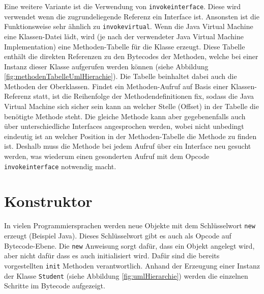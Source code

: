 \documentclass[conference]{IEEEtran}
\begin{document}
Eine weitere Variante ist die Verwendung von \verb|invokeinterface|. Diese wird verwendet wenn die zugrundeliegende Referenz ein Interface ist. Ansonsten ist die Funktionsweise sehr ähnlich zu \verb|invokevirtual|. Wenn die Java Virtual Machine eine Klassen-Datei lädt, wird (je nach der verwendeter Java Virtual Machine Implementation) eine Methoden-Tabelle für die Klasse erzeugt. Diese Tabelle enthält die direkten Referenzen zu den Bytecodes der Methoden, welche bei einer Instanz dieser Klasse aufgerufen werden können (siehe Abbildung \ref{fig:methodenTabelleUmlHierachie}). Die Tabelle beinhaltet dabei auch die Methoden der Oberklassen. Findet ein Methoden-Aufruf auf Basis einer Klassen-Referenz statt, ist die Reihenfolge der Methodendefinitionen fix, sodass die Java Virtual Machine sich sicher sein kann an welcher Stelle (Offset) in der Tabelle die benötigte Methode steht. Die gleiche Methode kann aber gegebenenfalls auch über unterschiedliche Interfaces angesprochen werden, wobei nicht unbedingt eindeutig ist an welcher Position in der Methoden-Tabelle die Methode zu finden ist. Deshalb muss die Methode bei jedem Aufruf über ein Interface neu gesucht werden, was wiederum einen gesonderten Aufruf mit dem Opcode \verb|invokeinterface| notwendig macht.\cite{Venners.1997}

\section{Konstruktor}
In vielen Programmiersprachen werden neue Objekte mit dem Schlüsselwort \verb|new| erzeugt (Beispiel Java). Dieses Schlüsselwort gibt es auch als Opcode auf Bytecode-Ebene. Die \verb|new| Anweisung sorgt dafür, dass ein Objekt angelegt wird, aber nicht dafür dass es auch initialisiert wird. Dafür sind die bereits vorgestellten \verb|init| Methoden verantwortlich. Anhand der Erzeugung einer Instanz der Klasse \verb|Student| (siehe Abbildung \ref{fig:umlHierarchie}) werden die einzelnen Schritte im Bytecode aufgezeigt.
\end{document}

